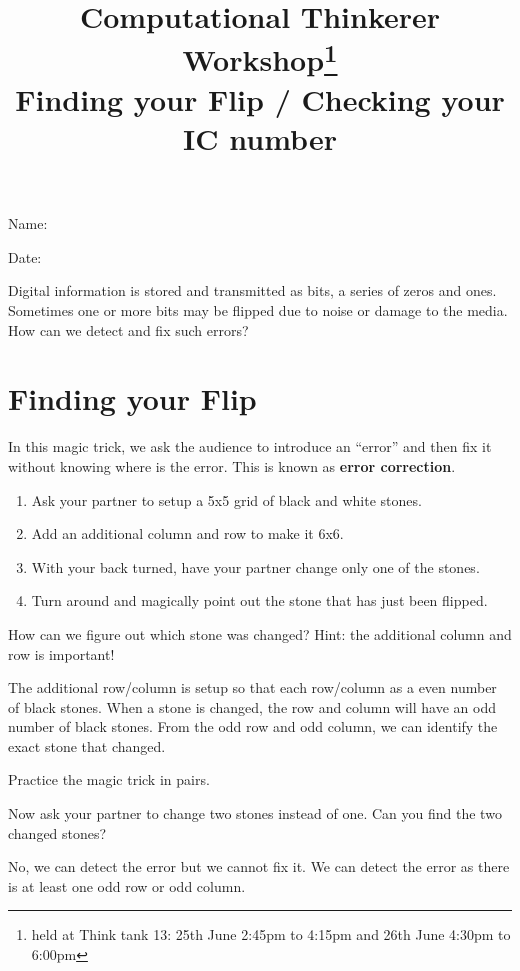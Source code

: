 \documentclass[a4paper,12pt]{article}
\title{Computational Thinkerer Workshop\footnote{held at Think tank 13: 25th June 2:45pm to 4:15pm and 26th June 4:30pm to 6:00pm}\\
Finding your Flip / Checking your IC number
\vspace{-2cm}}
\date{}
\newcommand\Blank[2][.33\linewidth]{%
  \rule{0pt}{4ex}%
  #2\enspace
  \makebox[#1]{\hrulefill}}
\begin{document}
\maketitle
\begin{flushright}
  \Blank{Name:}

  \Blank{Date:}
\end{flushright}

Digital information is stored and transmitted as bits, a series of
zeros and ones. Sometimes one or more bits may be flipped due to noise or damage
to the media. How can we detect and fix such errors?

\section*{Finding your Flip}
In this magic trick, we ask the audience to introduce an ``error'' and then fix
it without knowing where is the error. This is known as \textbf{error correction}.
\begin{enumerate}
    \item Ask your partner to setup a 5x5 grid of black and white stones.
    \item Add an additional column and row to make it 6x6.
    \item With your back turned, have your partner change only one of the stones.
    \item Turn around and magically point out the stone that has just been flipped.
\end{enumerate}

\begin{question}[skip-below=3\baselineskip]
How can we figure out which stone was changed? Hint: the additional column and row is important!
\end{question}
\begin{solution}
The additional row/column is setup so that each row/column as a even number of black stones.
When a stone is changed, the row and column will have an odd number of black stones.
From the odd row and odd column, we can identify the exact stone that changed.  
\end{solution}

\begin{question}[skip-below=3\baselineskip]
Practice the magic trick in pairs.
\end{question}

\begin{question}[skip-below=3\baselineskip,name=Advance exercise]
Now ask your partner to change two stones instead of one. Can you find the two changed stones?
\end{question}
\begin{solution}
No, we can detect the error but we cannot fix it. We can detect the error as
there is at least one odd row or odd column.  
\end{solution}
\end{document}
